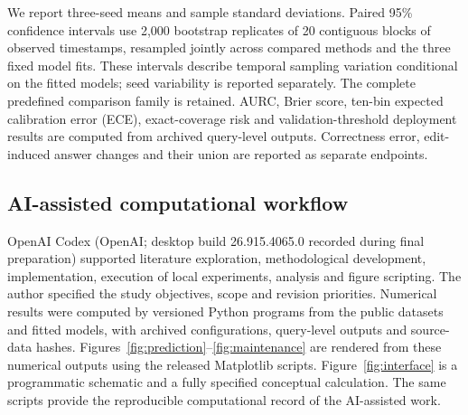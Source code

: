 We report three-seed means and sample standard deviations. Paired 95\% confidence intervals use 2,000 bootstrap replicates of 20 contiguous blocks of observed timestamps, resampled jointly across compared methods and the three fixed model fits. These intervals describe temporal sampling variation conditional on the fitted models; seed variability is reported separately. The complete predefined comparison family is retained. AURC, Brier score, ten-bin expected calibration error (ECE), exact-coverage risk and validation-threshold deployment results are computed from archived query-level outputs. Correctness error, edit-induced answer changes and their union are reported as separate endpoints.

\subsection{AI-assisted computational workflow}
OpenAI Codex (OpenAI; desktop build 26.915.4065.0 recorded during final preparation) supported literature exploration, methodological development, implementation, execution of local experiments, analysis and figure scripting. The author specified the study objectives, scope and revision priorities. Numerical results were computed by versioned Python programs from the public datasets and fitted models, with archived configurations, query-level outputs and source-data hashes. Figures~\ref{fig:prediction}--\ref{fig:maintenance} are rendered from these numerical outputs using the released Matplotlib scripts. Figure~\ref{fig:interface} is a programmatic schematic and a fully specified conceptual calculation. The same scripts provide the reproducible computational record of the AI-assisted work.
